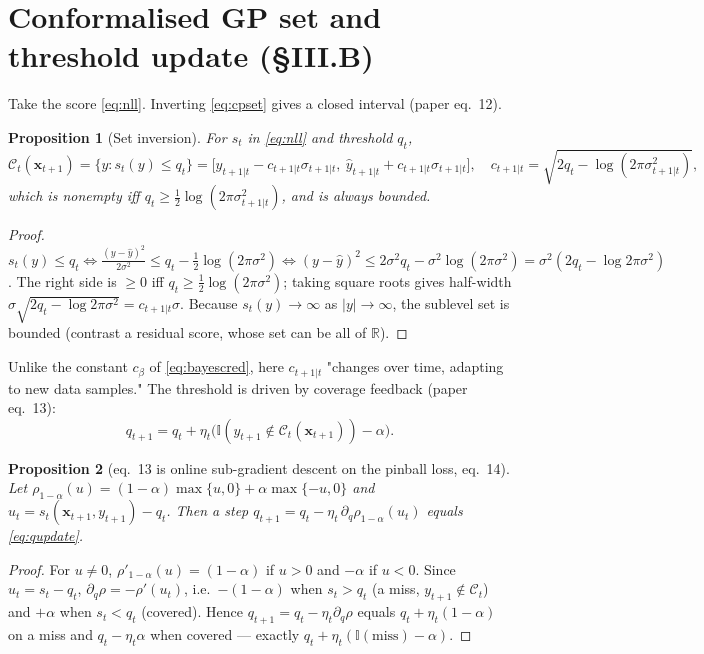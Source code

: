 \documentclass[11pt]{article}
\theoremstyle{plain}
\newtheorem{proposition}{Proposition}
\theoremstyle{definition}
\newcommand{\R}{\mathbb{R}}
\newcommand{\C}{\mathcal{C}}
\newcommand{\x}{\mathbf{x}}
\newcommand{\hy}{\hat{y}}
\newcommand{\indic}{\mathbb{I}}
\begin{document}
\section{Conformalised GP set and threshold update (\S III.B)}\label{sec:conf-set}
Take the score \eqref{eq:nll}. Inverting \eqref{eq:cpset} gives a closed interval (paper eq.~12).
\begin{proposition}[Set inversion]\label{prop:setinv}
For $s_t$ in \eqref{eq:nll} and threshold $q_t$,
\begin{equation}
\C_t(\x_{t+1})=\{y:s_t(y)\le q_t\}=\big[\hy_{t+1|t}-c_{t+1|t}\sigma_{t+1|t},\ \hy_{t+1|t}+c_{t+1|t}\sigma_{t+1|t}\big],\quad
c_{t+1|t}=\sqrt{2q_t-\log(2\pi\sigma^2_{t+1|t})},
\label{eq:setinv}
\end{equation}
which is nonempty iff $q_t\ge\tfrac12\log(2\pi\sigma^2_{t+1|t})$, and is always \emph{bounded}.
\end{proposition}
\begin{proof}
$s_t(y)\le q_t\iff \tfrac{(y-\hy)^2}{2\sigma^2}\le q_t-\tfrac12\log(2\pi\sigma^2)\iff(y-\hy)^2\le 2\sigma^2 q_t-\sigma^2\log(2\pi\sigma^2)=\sigma^2(2q_t-\log2\pi\sigma^2)$. The right side is $\ge0$ iff $q_t\ge\tfrac12\log(2\pi\sigma^2)$; taking square roots gives half-width $\sigma\sqrt{2q_t-\log2\pi\sigma^2}=c_{t+1|t}\sigma$. Because $s_t(y)\to\infty$ as $|y|\to\infty$, the sublevel set is bounded (contrast a residual score, whose set can be all of $\R$).
\end{proof}
Unlike the constant $c_\beta$ of \eqref{eq:bayescred}, here $c_{t+1|t}$ "changes over time, adapting to new data samples." The threshold is driven by coverage feedback (paper eq.~13):
\begin{equation}
q_{t+1}=q_t+\eta_t\big(\indic(y_{t+1}\notin\C_t(\x_{t+1}))-\alpha\big).
\label{eq:qupdate}
\end{equation}
\begin{proposition}[eq.~13 is online sub-gradient descent on the pinball loss, eq.~14]\label{prop:pinball}
Let $\rho_{1-\alpha}(u)=(1-\alpha)\max\{u,0\}+\alpha\max\{-u,0\}$ and $u_t=s_t(\x_{t+1},y_{t+1})-q_t$. Then a step $q_{t+1}=q_t-\eta_t\,\partial_{q}\rho_{1-\alpha}(u_t)$ equals \eqref{eq:qupdate}.
\end{proposition}
\begin{proof}
For $u\ne0$, $\rho'_{1-\alpha}(u)=(1-\alpha)$ if $u>0$ and $-\alpha$ if $u<0$. Since $u_t=s_t-q_t$, $\partial_q\rho=-\rho'(u_t)$, i.e.\ $-(1-\alpha)$ when $s_t>q_t$ (a miss, $y_{t+1}\notin\C_t$) and $+\alpha$ when $s_t<q_t$ (covered). Hence $q_{t+1}=q_t-\eta_t\partial_q\rho$ equals $q_t+\eta_t(1-\alpha)$ on a miss and $q_t-\eta_t\alpha$ when covered --- exactly $q_t+\eta_t(\indic(\text{miss})-\alpha)$.
\end{proof}
\end{document}
